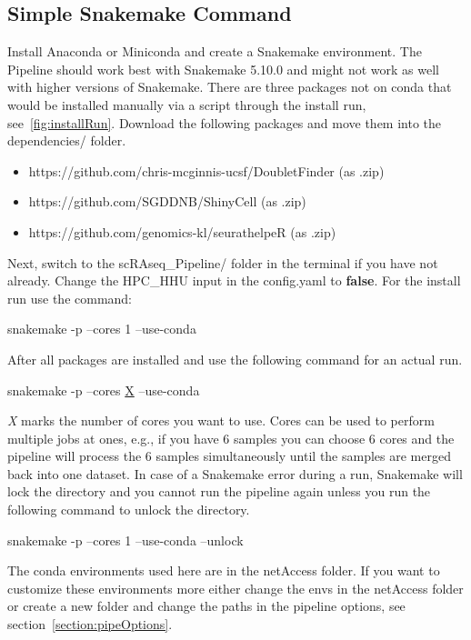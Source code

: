 \subsection{Simple Snakemake Command}
Install Anaconda or Miniconda and create a Snakemake environment. The Pipeline should work best with Snakemake 5.10.0 and might not work as well with higher versions of Snakemake. There are three packages not on conda that would be installed manually via a script through the install run, see~\ref{fig:installRun}. Download the following packages and move them into the dependencies/ folder.
\begin{itemize}
	\item https://github.com/chris-mcginnis-ucsf/DoubletFinder (as .zip)
	\item https://github.com/SGDDNB/ShinyCell (as .zip)
	\item https://github.com/genomics-kl/seurathelpeR (as .zip)
\end{itemize}
Next, switch to the scRAseq\_Pipeline/ folder in the terminal if you have not already. Change the HPC\_HHU input in the config.yaml to \textbf{false}. For the install run use the command:
\begin{center}
	snakemake -p --cores 1 --use-conda
\end{center}
After all packages are installed and use the following command for an actual run. 
\begin{center}
	snakemake -p --cores \underline{X} --use-conda
\end{center}
\textit{X} marks the number of cores you want to use. Cores can be used to perform multiple jobs at ones, e.g., if you have 6 samples you can choose 6 cores and the pipeline will process the 6 samples simultaneously until the samples are merged back into one dataset. In case of a Snakemake error during a run, Snakemake will lock the directory and you cannot run the pipeline again unless you run the following command to unlock the directory.
\begin{center}
	snakemake -p --cores 1 --use-conda --unlock
\end{center}
The conda environments used here are in the netAccess folder. If you want to customize these environments more either change the envs in the netAccess folder or create a new folder and change the paths in the pipeline options, see section~\ref{section:pipeOptions}.


